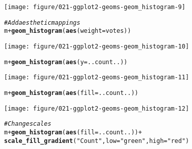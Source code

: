 \documentclass[a4paper,titlepage]{tufte-handout}\usepackage[]{graphicx}\usepackage[]{color}
\makeatletter
\def\maxwidth{ %
  \ifdim\Gin@nat@width>\linewidth
    \linewidth
  \else
    \Gin@nat@width
  \fi
}
\newcommand{\hlstr}[1]{\textcolor[rgb]{0.192,0.494,0.8}{#1}}%
\newcommand{\hlcom}[1]{\textcolor[rgb]{0.678,0.584,0.686}{\textit{#1}}}%
\newcommand{\hlopt}[1]{\textcolor[rgb]{0,0,0}{#1}}%
\newcommand{\hlstd}[1]{\textcolor[rgb]{0.345,0.345,0.345}{#1}}%
\newcommand{\hlkwc}[1]{\textcolor[rgb]{0.333,0.667,0.333}{#1}}%
\newcommand{\hlkwd}[1]{\textcolor[rgb]{0.737,0.353,0.396}{\textbf{#1}}}%
\newenvironment{kframe}{%
 \def\at@end@of@kframe{}%
 \ifinner\ifhmode%
  \def\at@end@of@kframe{\end{minipage}}%
  \begin{minipage}{\columnwidth}%
 \fi\fi%
 \def\FrameCommand##1{\hskip\@totalleftmargin \hskip-\fboxsep
 \colorbox{shadecolor}{##1}\hskip-\fboxsep
     \hskip-\linewidth \hskip-\@totalleftmargin \hskip\columnwidth}%
 \MakeFramed {\advance\hsize-\width
   \@totalleftmargin\z@ \linewidth\hsize
   \@setminipage}}%
 {\par\unskip\endMakeFramed%
 \at@end@of@kframe}
\newenvironment{knitrout}{}{} %
\makeatother
\begin{document}
\begin{knitrout}
\begin{kframe}
{\ttfamily\noindent\color{warningcolor}{\#\# Warning in loop\_apply(n, do.ply): position\_stack requires constant width: output may be incorrect}}\end{kframe}
\texttt{[image: figure/021-ggplot2-geoms-geom\_histogram-9]} 
\begin{kframe}\begin{alltt}
\hlcom{# Add aesthetic mappings}
\hlstd{m} \hlopt{+} \hlkwd{geom_histogram}\hlstd{(}\hlkwd{aes}\hlstd{(}\hlkwc{weight} \hlstd{= votes))}
\end{alltt}


{\ttfamily\noindent\color{warningcolor}{\#\# Warning in loop\_apply(n, do.ply): position\_stack requires constant width: output may be incorrect}}\end{kframe}
\texttt{[image: figure/021-ggplot2-geoms-geom\_histogram-10]} 
\begin{kframe}\begin{alltt}
\hlstd{m} \hlopt{+} \hlkwd{geom_histogram}\hlstd{(}\hlkwd{aes}\hlstd{(}\hlkwc{y} \hlstd{= ..count..))}
\end{alltt}


{\ttfamily\noindent\color{warningcolor}{\#\# Warning in loop\_apply(n, do.ply): position\_stack requires constant width: output may be incorrect}}\end{kframe}
\texttt{[image: figure/021-ggplot2-geoms-geom\_histogram-11]} 
\begin{kframe}\begin{alltt}
\hlstd{m} \hlopt{+} \hlkwd{geom_histogram}\hlstd{(}\hlkwd{aes}\hlstd{(}\hlkwc{fill} \hlstd{= ..count..))}
\end{alltt}


{\ttfamily\noindent\color{warningcolor}{\#\# Warning in loop\_apply(n, do.ply): position\_stack requires constant width: output may be incorrect}}\end{kframe}
\texttt{[image: figure/021-ggplot2-geoms-geom\_histogram-12]} 
\begin{kframe}\begin{alltt}
\hlcom{# Change scales}
\hlstd{m} \hlopt{+} \hlkwd{geom_histogram}\hlstd{(}\hlkwd{aes}\hlstd{(}\hlkwc{fill} \hlstd{= ..count..))} \hlopt{+}
  \hlkwd{scale_fill_gradient}\hlstd{(}\hlstr{"Count"}\hlstd{,} \hlkwc{low} \hlstd{=} \hlstr{"green"}\hlstd{,} \hlkwc{high} \hlstd{=} \hlstr{"red"}\hlstd{)}
\end{alltt}



\end{kframe}
\end{knitrout}
\end{document}
